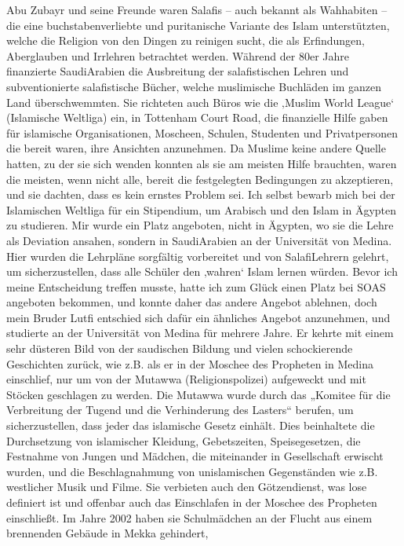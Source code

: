 \documentclass[12pt]{memoir}
\begin{document}
Abu Zubayr und seine Freunde waren Salafis – auch bekannt als Wahhabiten –
die eine buchstabenverliebte und puritanische
Variante des Islam unterstützten,
welche die Religion von den Dingen zu reinigen sucht,
die als Erfindungen, Aberglauben und Irrlehren betrachtet werden.
Während der 80er Jahre finanzierte Saudi\–Arabien
die Ausbreitung der salafistischen Lehren
und subventionierte salafistische Bücher,
welche muslimische Buchläden im ganzen Land überschwemmten.
Sie richteten auch Büros wie die ‚Muslim World League‘
(Islamische Weltliga) ein,
in Tottenham Court Road,
die finanzielle Hilfe gaben für islamische Organisationen,
Moscheen, Schulen, Studenten und Privatpersonen
die bereit waren, ihre Ansichten anzunehmen.
Da Muslime keine andere Quelle hatten, zu der sie sich wenden konnten
als sie am meisten Hilfe brauchten,
waren die meisten, wenn nicht alle,
bereit die festgelegten Bedingungen zu akzeptieren,
und sie dachten, dass es kein ernstes Problem sei.
Ich selbst bewarb mich bei der Islamischen Weltliga
für ein Stipendium, um Arabisch und den Islam in Ägypten zu studieren.
Mir wurde ein Platz angeboten,
nicht in Ägypten, wo sie die Lehre als Deviation ansahen,
sondern in Saudi\–Arabien an der Universität von Medina.
Hier wurden die Lehrpläne sorgfältig vorbereitet
und von Salafi\–Lehrern gelehrt,
um sicherzustellen, dass alle Schüler den ‚wahren‘ Islam lernen würden.
Bevor ich meine Entscheidung treffen musste,
hatte ich zum Glück einen Platz bei SOAS angeboten bekommen,
und konnte daher das andere Angebot ablehnen,
doch mein Bruder Lutfi entschied sich dafür ein ähnliches Angebot anzunehmen,
und studierte an der Universität von Medina für mehrere Jahre.
Er kehrte mit einem sehr düsteren Bild von der saudischen Bildung
und vielen schockierende Geschichten zurück,
wie z.B. als er in der Moschee des Propheten in Medina einschlief,
nur um von der Mutawwa (Religionspolizei)
aufgeweckt und mit Stöcken geschlagen zu werden.
Die Mutawwa wurde durch das „Komitee für die Verbreitung der Tugend
und die Verhinderung des Lasters“ berufen, um sicherzustellen,
dass jeder das islamische Gesetz einhält.
Dies beinhaltete die Durchsetzung von islamischer Kleidung,
Gebetszeiten, Speisegesetzen,
die Festnahme von Jungen und Mädchen,
die miteinander in Gesellschaft erwischt wurden,
und die Beschlagnahmung von unislamischen Gegenständen
wie z.B. westlicher Musik und Filme.
Sie verbieten auch den Götzendienst,
was lose definiert ist und offenbar auch
das Einschlafen in der Moschee des Propheten einschließt.
Im Jahre 2002 haben sie Schulmädchen an der Flucht
aus einem brennenden Gebäude in Mekka gehindert,
\end{document}
